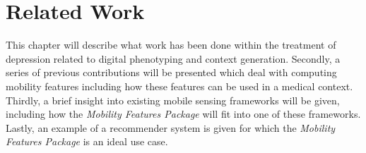 \chapter{Related Work}
\label{chapter:02}
This chapter will describe what work has been done within the treatment of depression related to digital phenotyping and context generation. Secondly, a series of previous contributions will be presented which deal with computing mobility features including how these features can be used in a medical context. Thirdly, a brief insight into existing mobile sensing frameworks will be given, including how the \textit{Mobility Features Package} will fit into one of these frameworks. Lastly, an example of a recommender system is given for which the \textit{Mobility Features Package} is an ideal use case.











